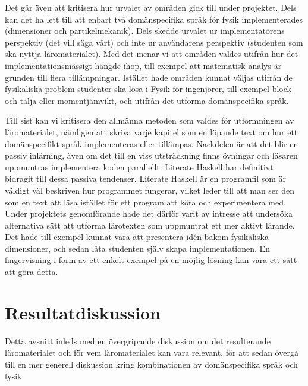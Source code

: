 Det går även att kritisera hur urvalet av områden gick till under projektet. Dels kan det ha lett till att enbart två domänspecifika språk för fysik implementerades (dimensioner och partikelmekanik). Dels skedde urvalet ur implementatörens perspektiv (det vill säga  vårt) och inte ur användarens perspektiv (studenten som ska nyttja läromaterialet). Med det menar vi att områden valdes utifrån hur det implementationsmässigt hängde ihop, till exempel att matematisk analys är grunden till flera tillämpningar. Istället hade områden kunnat väljas utifrån de fysikaliska problem studenter ska lösa i Fysik för ingenjörer, till exempel block och talja eller momentjämvikt, och utifrån det utforma domänspecifika språk.


Till sist kan vi kritisera den allmänna metoden som valdes för utformningen av läromaterialet, nämligen att skriva varje kapitel som en löpande text om hur ett domänspecifikt språk implementeras eller tillämpas. Nackdelen är att det blir en passiv inlärning, även om det till en viss utsträckning finns övningar och läsaren uppmuntras implementera koden parallellt. Literate Haskell har definitivt bidragit till dessa passiva tendenser. Literate Haskell är en programfil som är väldigt väl beskriven hur programmet fungerar, vilket leder till att man ser den som en text att läsa istället för ett program att köra och experimentera med. Under projektets genomförande hade det därför varit av intresse att undersöka alternativa sätt att utforma lärotexten som uppmuntrat ett mer aktivt lärande. Det hade till exempel kunnat vara att presentera idén bakom fysikaliska dimensioner, och sedan låta studenten själv skapa implementationen. En fingervisning i form av ett enkelt exempel på en möjlig lösning kan vara ett sätt att göra detta.

\section{Resultatdiskussion}\label{sec:res_disk}

Detta avsnitt inleds med en övergripande diskussion om det resulterande
läromaterialet och för vem läromaterialet kan vara relevant, för att sedan
övergå till en mer generell diskussion kring kombinationen av domänspecifika
språk och fysik.

